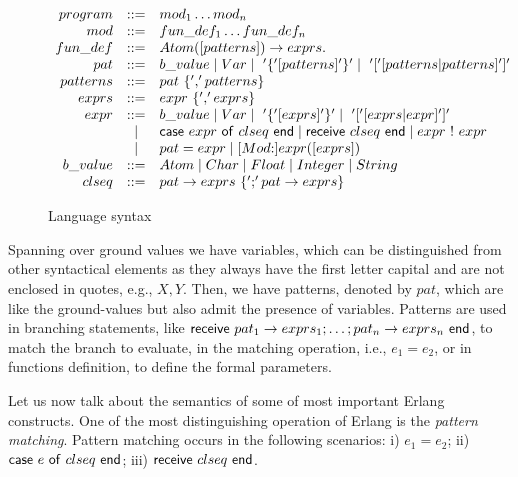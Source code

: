 \documentclass{article}[12pt,a4paper]
\theoremstyle{definition}
\newcommand{\cons}{\mbox{:}}
\begin{document}
\begin{figure}[t]
  \begin{center}
    $
    \begin{array}{rcl@{~~~~~~}l}

      program & ::= & mod_1  \dots  mod_n \\
      mod & ::= & fun\_def_1  \dots fun\_def_n  \\
      fun\_def & ::= & Atom([patterns]) \to exprs.\\
      pat & ::= & b\_value \mid Var \mid ~'\{'[patterns]'\}' \mid ~
                  '['[patterns|patterns] ']'\\
      patterns & ::= & pat ~\{ ','patterns\} \\
      exprs & ::= & expr ~\{ ',' exprs\} \\
      expr & ::= & b\_value \mid Var \mid ~'\{'[exprs]'\}' \mid ~'[' [exprs|expr] ']' \\
                    & \mid & \ms{case}~expr~\ms{of}~clseq~\mathsf{end} \mid
                             \ms{receive}~clseq~\mathsf{end} \mid expr ~ ! ~ expr \\
                    & \mid & pat = expr \mid
                             [Mod\cons]expr([exprs]) \\
      b\_value & ::= & Atom \mid Char \mid Float \mid Integer \mid String \\
      clseq & ::= & pat  \to exprs ~ \{ ';' pat \to exprs  \} \\
    \end{array}
    $
  \end{center}
  \caption{Language syntax} \label{ErlangSyntax}
\end{figure}

Spanning over ground values we have variables, which can be distinguished
from other syntactical elements as they always have the first letter capital and
are not enclosed in quotes, e.g., $X,Y$.
Then, we have patterns, denoted by $pat$, which are like the ground-values
but also admit the presence of variables. Patterns are used in branching
statements, like $\mathsf{receive}~pat_1 \rightarrow exprs_1; \ldots; pat_n
\rightarrow exprs_n~\mathsf{end}$, to match the branch
to evaluate, in the matching operation, i.e., $e_1 = e_2$, or in functions
definition, to define the formal parameters. 

Let us now talk about the semantics of some of most important Erlang constructs.
One of the most distinguishing operation of Erlang is the \emph{pattern
  matching}. Pattern matching occurs in the following scenarios: i) $e_1 = e_2$; ii)
$\mathsf{case}~e~\mathsf{of}~clseq~\mathsf{end}$; iii) $\mathsf{receive}~clseq~\mathsf{end}$.
\end{document}
